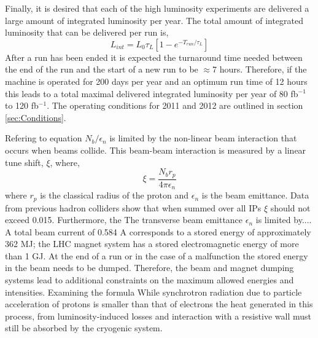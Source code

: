 Finally, it is desired that each of the high luminosity experiments
are delivered a large amount of integrated luminosity per year. %
The total amount of integrated luminosity that can be delivered
per run is,
\begin{equation}
L_{int}=L_{0}\tau_{L}\left[ 1-e^{-T_{run}/\tau_{L}}\right]
\end{equation}
After a run has been ended it is expected the turnaround time
needed between the end of the run and the start of a new run
to be $\approx$7 hours. Therefore, if the machine is operated for 200 days
per year and an optimum run time of 12 hours this leads to a 
total maximal delivered integrated luminosity per year of 80 fb$^{-1}$
to 120 fb$^{-1}$. The operating conditions for 2011 and 2012
are outlined in section \ref{sec:Conditions}.

Refering to equation %
$N_{b}/\epsilon_{n}$ is limited by the %
non-linear beam interaction that occurs when beams collide. This
beam-beam interaction is measured by a linear tune shift, $\xi$, where,
\begin{equation}
\xi=\frac{N_{b}r_{p}}{4\pi\epsilon_{n}}
\end{equation}
where $r_{p}$ is the classical radius of the proton
and $\epsilon_{n}$ is the beam emittance.
Data from previous hadron colliders show that when summed over
all IPs $\xi$ should not exceed 0.015. %
Furthermore, the %
The transverse beam emittance $\epsilon_{n}$ is limited by.... 
A total beam current of 0.584 A corresponds to a stored energy
of approximately 362 MJ; the LHC magnet system has a stored
electromagnetic energy of more than 1 GJ.
At the end of a run or in the case of a malfunction the stored
energy in the beam needs to be dumped. Therefore, the beam
and magnet dumping systems lead to additional constraints
on the maximum allowed energies and intensities.
Examining the formula
While synchrotron radiation due to particle acceleration of protons%
is smaller than that of electrons the heat generated in this process,
 from luminosity-induced losses and interaction with a resistive wall
must still be absorbed by the cryogenic system. 

